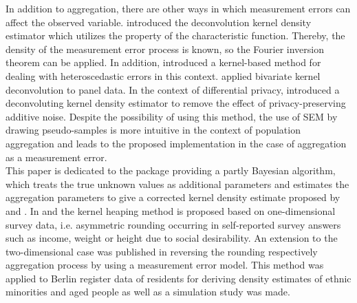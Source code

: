 In addition to aggregation, there are other ways in which measurement errors can affect the observed variable. \cite{Carroll1990} introduced the deconvolution kernel density estimator which utilizes the property of the characteristic function.
Thereby, the density of the measurement error process is known, so the Fourier inversion theorem can be applied. In addition, \cite{Delaigle2014NonparametricKM}
introduced a kernel-based method for dealing with heteroscedastic errors in this context. \cite{Sankhya} applied bivariate kernel deconvolution to panel data.
In the context of differential privacy, \cite{Farokhi2020} introduced a deconvoluting kernel density estimator to remove the effect of privacy-preserving additive noise.  
Despite the possibility of using this method, the use of SEM by drawing pseudo-samples is more intuitive in the context of population aggregation and leads to the proposed implementation in the case of aggregation as a measurement error. \\

This paper is dedicated to the  package \hyperlink{https://cran.r-project.org/web/packages/Kernelheaping/index.html}{} providing a partly Bayesian algorithm, which treats the true unknown values as additional parameters and estimates the aggregation parameters to give a corrected kernel density estimate proposed by \cite{KDEforHeapedData} and \cite{MigranteAndAgedPeople}. In \cite{KDEforHeapedData} and \cite{GroupedData} the kernel heaping method is proposed based on one-dimensional survey data, i.e. asymmetric rounding occurring in self-reported survey answers such as income, weight or height due to social desirability. An extension to the two-dimensional case was published in \cite{MigranteAndAgedPeople} reversing the rounding respectively aggregation process by using a measurement error model. This method was applied to Berlin register data of residents for deriving density estimates of ethnic minorities and aged people as well as a simulation study was made. \\

